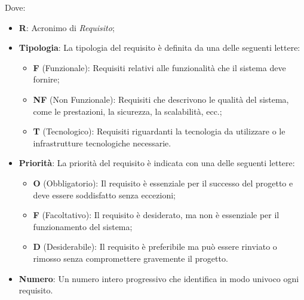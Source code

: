 Dove:
\begin{itemize}
    \item \textbf{R}: Acronimo di \textit{Requisito};
    \item \textbf{Tipologia}: La tipologia del requisito è definita da una delle seguenti lettere:
        \begin{itemize}
            \item \textbf{F} (Funzionale): Requisiti relativi alle funzionalità che il sistema deve fornire;
            \item \textbf{NF} (Non Funzionale): Requisiti che descrivono le qualità del sistema, come le prestazioni, la sicurezza, la scalabilità, ecc.;
            \item \textbf{T} (Tecnologico): Requisiti riguardanti la tecnologia da utilizzare o le infrastrutture tecnologiche necessarie.
        \end{itemize}
    \item \textbf{Priorità}: La priorità del requisito è indicata con una delle seguenti lettere:
        \begin{itemize}
            \item \textbf{O} (Obbligatorio): Il requisito è essenziale per il successo del progetto e deve essere soddisfatto senza eccezioni;
            \item \textbf{F} (Facoltativo): Il requisito è desiderato, ma non è essenziale per il funzionamento del sistema;
            \item \textbf{D} (Desiderabile): Il requisito è preferibile ma può essere rinviato o rimosso senza compromettere gravemente il progetto.
        \end{itemize}
    \item \textbf{Numero}: Un numero intero progressivo che identifica in modo univoco ogni requisito.
\end{itemize}

